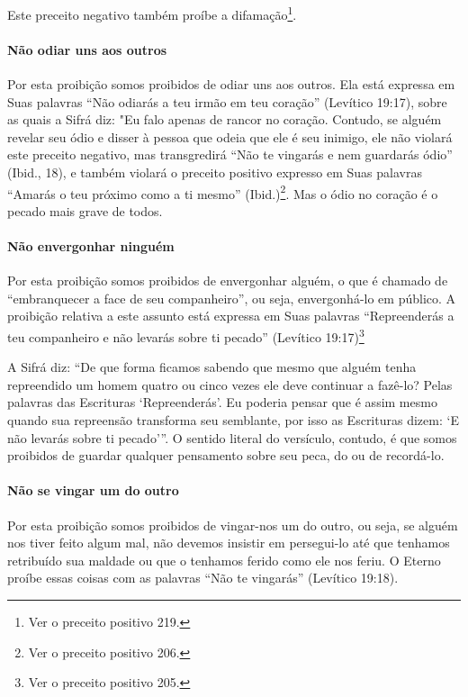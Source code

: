 Este preceito negativo também proíbe a difamação\footnote{Ver o preceito positivo 219.}.

\paragraph{Não odiar uns aos outros}

Por esta proibição somos proibidos de odiar uns aos outros. Ela está
expressa em Suas palavras ``Não odiarás a teu irmão em teu coração''
(Levítico 19:17), sobre as quais a Sifrá diz: "Eu falo apenas de rancor
no coração. Contudo, se alguém revelar seu ódio e
disser à pessoa que odeia que ele é seu inimigo, ele não violará este
preceito negativo, mas transgredirá ``Não te vingarás e nem guardarás
ódio'' (Ibid., 18), e também violará o preceito positivo expresso em
Suas palavras ``Amarás o teu próximo como a ti mesmo''
(Ibid.)\footnote{Ver o preceito positivo 206.}. Mas o ódio no coração é o pecado mais
grave de todos.

\paragraph{Não envergonhar ninguém}

Por esta proibição somos proibidos de envergonhar alguém, o que é
chamado de ``embranquecer a face de seu companheiro'', ou seja,
envergonhá-lo em público. A proibição relativa a este assunto está expressa em
Suas palavras ``Repreenderás a teu companheiro e não levarás sobre ti
pecado'' (Levítico 19:17)\footnote{Ver o preceito positivo 205.}

A Sifrá diz: ``De que forma ficamos sabendo que mesmo que alguém tenha
repreendido um homem quatro ou cinco vezes ele deve continuar a fazê-lo?
Pelas palavras das Escrituras `Repreenderás'. Eu poderia pensar que é
assim mesmo quando sua repreensão transforma seu semblante, por isso as
Escrituras dizem: `E não levarás sobre ti pecado'''. O sentido literal
do versículo, contudo, é que somos proibidos de guardar qualquer
pensamento sobre seu peca, do ou de recordá-lo.

\paragraph{Não se vingar um do outro}

Por esta proibição somos proibidos de vingar-nos um do outro, ou seja,
se alguém nos tiver feito algum mal, não devemos insistir em persegui-lo
até que tenhamos retribuído sua maldade ou que o tenhamos ferido como
ele nos feriu. O Eterno proíbe essas coisas com as palavras ``Não te
vingarás'' (Levítico 19:18).

